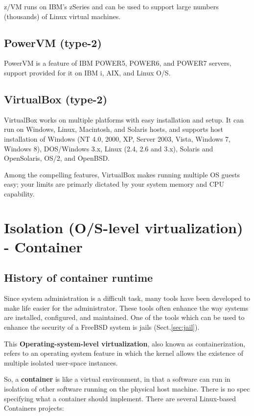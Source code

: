z/VM runs on IBM's zSeries and can be used to support large numbers (thousands)
of Linux virtual machines.

\section{PowerVM (type-2)}

PowerVM is a feature of IBM POWER5, POWER6, and POWER7 servers, support
provided for it on IBM i, AIX, and Linux O/S.

\section{VirtualBox (type-2)}
\label{sec:VirtualBox}

 VirtualBox works on multiple platforms with easy installation and setup.  It
 can run on Windows, Linux, Macintosh, and Solaris hosts, and supports host
 installation of Windows (NT 4.0, 2000, XP, Server 2003, Vista, Windows 7,
 Windows 8), DOS/Windows 3.x, Linux (2.4, 2.6 and 3.x), Solaris and OpenSolaris,
 OS/2, and OpenBSD.
 
Among the compelling features, VirtualBox makes running multiple OS guests easy;
your limits are primarly dictated by your system memory and CPU capability.

\chapter{Isolation (O/S-level virtualization) - Container}

\section{History of container runtime}
\label{sec:container-technology-history}

Since system administration is a difficult task, many tools have been developed
to make life easier for the administrator. These tools often enhance the way
systems are installed, configured, and maintained. One of the tools which can be
used to enhance the security of a FreeBSD system is jails (Sect.\ref{sec:jail}).

This {\bf Operating-system-level virtualization},
also known as containerization, refers to an operating system feature in which
the kernel allows the existence of multiple isolated user-space instances.

So, a {\bf container} is like a virtual environment, in that a software can
run in isolation of other software running on the physical host machine.
There is no spec specifying what a container should implement.
There are several Linux-based Containers projects:

